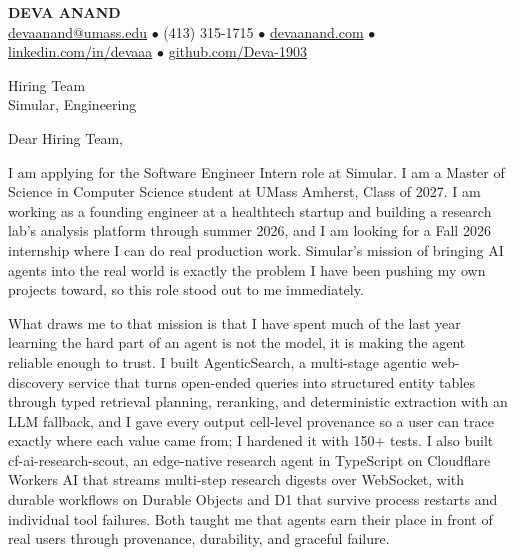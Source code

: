 \documentclass[letterpaper,11pt]{article}
\begin{document}
\begin{center}
    {\fontsize{18}{20}\selectfont\bfseries DEVA ANAND}\\ \vspace{3pt}
    {\small
    \href{mailto:devaanand@umass.edu}{devaanand@umass.edu}
    \enspace$\bullet$\enspace
    (413) 315-1715
    \enspace$\bullet$\enspace
    \href{https://devaanand.com}{devaanand.com}
    \enspace$\bullet$\enspace
    \href{https://linkedin.com/in/devaaa/}{linkedin.com/in/devaaa}
    \enspace$\bullet$\enspace
    \href{https://github.com/Deva-1903}{github.com/Deva-1903}}
\end{center}
\vspace{6pt}

\noindent Hiring Team \\
Simular, Engineering

\vspace{2pt}

\noindent Dear Hiring Team,

I am applying for the Software Engineer Intern role at Simular. I am a Master of Science in Computer Science student at UMass Amherst, Class of 2027. I am working as a founding engineer at a healthtech startup and building a research lab's analysis platform through summer 2026, and I am looking for a Fall 2026 internship where I can do real production work. Simular's mission of bringing AI agents into the real world is exactly the problem I have been pushing my own projects toward, so this role stood out to me immediately.

What draws me to that mission is that I have spent much of the last year learning the hard part of an agent is not the model, it is making the agent reliable enough to trust. I built AgenticSearch, a multi-stage agentic web-discovery service that turns open-ended queries into structured entity tables through typed retrieval planning, reranking, and deterministic extraction with an LLM fallback, and I gave every output cell-level provenance so a user can trace exactly where each value came from; I hardened it with 150+ tests. I also built cf-ai-research-scout, an edge-native research agent in TypeScript on Cloudflare Workers AI that streams multi-step research digests over WebSocket, with durable workflows on Durable Objects and D1 that survive process restarts and individual tool failures. Both taught me that agents earn their place in front of real users through provenance, durability, and graceful failure.
\end{document}

